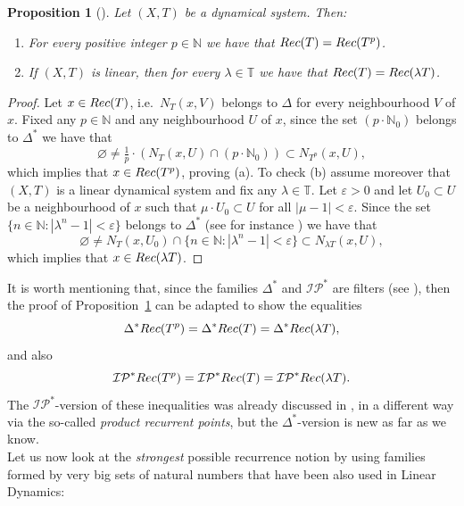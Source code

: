 \documentclass[openright,11pt]{article}
\theoremstyle{plain}
\newtheorem{proposition}[theorem]{Proposition}
\theoremstyle{definition}
\newcommand{\NN}{\mathbb{N}}
\newcommand{\TT}{\mathbb{T}}
\newcommand{\IP}{\mathcal{IP}}
\newcommand{\Rec}{\textup{Rec}}
\newcommand{\eps}{\varepsilon}
\begin{document}
\begin{proposition}[\textbf{\cite[Proposition~2.3]{CoMaPa2014}}]\label{Pro:Ansari+Leon-Muller}
	Let $(X,T)$ be a dynamical system. Then:
	\begin{enumerate}[{\em(a)}]
		\item For every positive integer $p \in \NN$ we have that $\Rec(T)=\Rec(T^p)$.
		
		\item If $(X,T)$ is linear, then for every $\lambda \in \TT$ we have that $\Rec(T)=\Rec(\lambda T)$.
	\end{enumerate}
\end{proposition}
\begin{proof}
	Let $x \in \Rec(T)$, i.e.\ $N_T(x,V)$ belongs to $\Delta$ for every neighbourhood $V$ of $x$. Fixed any $p \in \NN$ and any neighbourhood $U$ of $x$, since the set $(p \cdot \NN_0)$ belongs to $\Delta^*$ we have that
	\[
	\varnothing \neq \tfrac{1}{p} \cdot \left( N_T(x,U) \cap \left( p \cdot \NN_0 \right) \right) \subset N_{T^p}(x,U),
	\]
	which implies that $x \in \Rec(T^p)$, proving (a). To check (b) assume moreover that $(X,T)$ is a linear dynamical system and fix any $\lambda \in \TT$. Let $\eps>0$ and let $U_0 \subset U$ be a neighbourhood of $x$ such that $\mu \cdot U_0 \subset U$ for all $|\mu-1|<\eps$. Since the set $\{ n \in \NN : |\lambda^n-1|<\eps \}$ belongs to $\Delta^*$ (see for instance \cite[Proposition~4.1]{GriLo2023}) we have that
	\[
	\varnothing \neq N_T(x,U_0) \cap \{ n \in \NN : |\lambda^n-1|<\eps \} \subset N_{\lambda T}(x,U),
	\]
	which implies that $x \in \Rec(\lambda T)$.
\end{proof}

It is worth mentioning that, since the families $\Delta^*$ and $\IP^*$ are filters (see \cite{BerDown2008}), then the proof of Proposition~\ref{Pro:Ansari+Leon-Muller} can be adapted to show the equalities
\[
\Delta^*\Rec(T^p)=\Delta^*\Rec(T)=\Delta^*\Rec(\lambda T),
\]
and also
\[
\IP^*\Rec(T^p)=\IP^*\Rec(T)=\IP^*\Rec(\lambda T).
\]
The $\IP^*$-version of these inequalities was already discussed in \cite[Section~6]{BoGrLoPe2022}, in a different way via the so-called {\em product recurrent points}, but the $\Delta^*$-version is new as far as we know.\\[-5pt]

Let us now look at the {\em strongest} possible recurrence notion by using families formed by very big sets of natural numbers that have been also used in Linear Dynamics:
\end{document}
